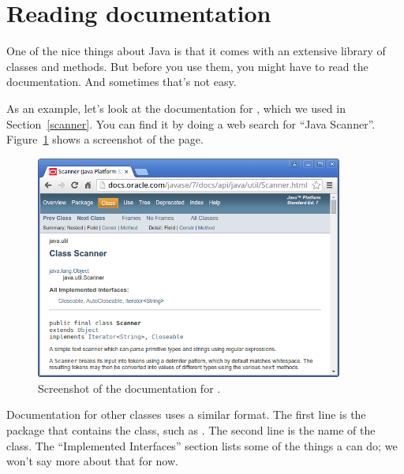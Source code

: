 


\section{Reading documentation}
\label{sec:apidocs}


One of the nice things about Java is that it comes with an extensive library of classes and methods.
But before you use them, you might have to read the documentation.
And sometimes that's not easy.

As an example, let's look at the documentation for , which we used in Section~\ref{scanner}.
You can find it by doing a web search for ``Java Scanner''.
Figure~\ref{fig.scanner} shows a screenshot of the page.

\begin{figure}[!ht]
\begin{center}
\includegraphics[width=0.9\textwidth]{figs/scanner.png}
\caption{Screenshot of the documentation for .}
\label{fig.scanner}
\end{center}
\end{figure}

Documentation for other classes uses a similar format.
The first line is the package that contains the class, such as .
The second line is the name of the class.
The ``Implemented Interfaces'' section lists some of the things a  can do; we won't say more about that for now.

